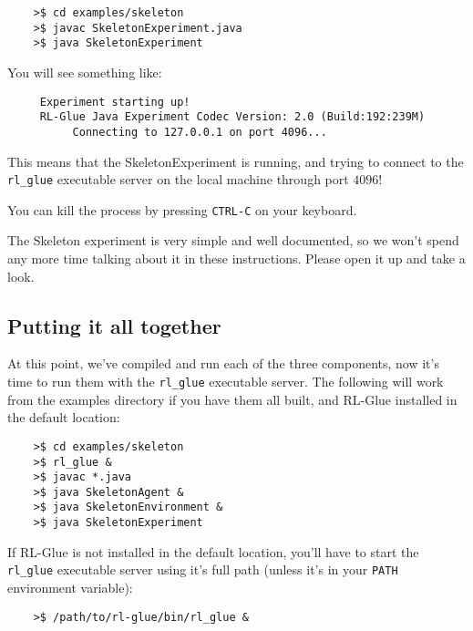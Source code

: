 \documentclass[11pt]{article}
\begin{document}
\begin{verbatim}
	>$ cd examples/skeleton
	>$ javac SkeletonExperiment.java
	>$ java SkeletonExperiment
\end{verbatim}

You will see something like:
\begin{verbatim}
     Experiment starting up!
     RL-Glue Java Experiment Codec Version: 2.0 (Build:192:239M)
          Connecting to 127.0.0.1 on port 4096...
\end{verbatim}

This means that the SkeletonExperiment is running, and trying to connect to the \texttt{rl\_glue} executable server on the local machine through port $4096$!  

You can kill the process by pressing \texttt{CTRL-C} on your keyboard.


The Skeleton experiment is very simple and well documented, so we won't spend any more time talking about it in these instructions.
Please open it up and take a look.


\subsection{Putting it all together}
At this point, we've compiled and run each of the three components, now it's time to run them with the \texttt{rl\_glue} executable server.  The following will work from the examples 
directory if you have them all built, and RL-Glue installed in the default location:
\begin{verbatim}
	>$ cd examples/skeleton
	>$ rl_glue &
	>$ javac *.java
	>$ java SkeletonAgent &
	>$ java SkeletonEnvironment &
	>$ java SkeletonExperiment
\end{verbatim}

If RL-Glue is not installed in the default location, you'll have to start the \texttt{rl\_glue} executable server using it's full path (unless it's in your \texttt{PATH} environment variable):
\begin{verbatim}
	>$ /path/to/rl-glue/bin/rl_glue &
\end{verbatim}
\end{document}
